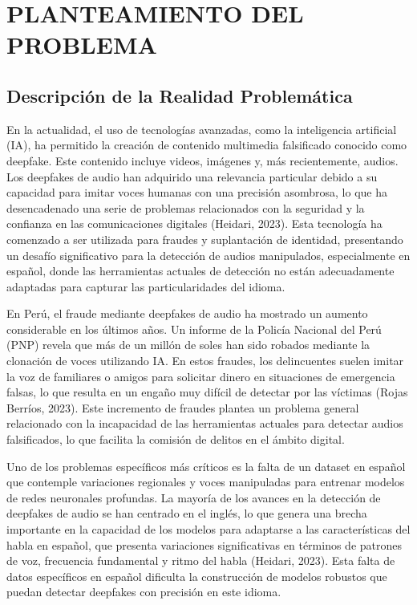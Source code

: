 \chapter{PLANTEAMIENTO DEL PROBLEMA}
\section{Descripción de la Realidad Problemática}

En la actualidad, el uso de tecnologías avanzadas, como la inteligencia artificial (IA), ha permitido la creación de contenido multimedia falsificado conocido como deepfake. Este contenido incluye videos, imágenes y, más recientemente, audios. Los deepfakes de audio han adquirido una relevancia particular debido a su capacidad para imitar voces humanas con una precisión asombrosa, lo que ha desencadenado una serie de problemas relacionados con la seguridad y la confianza en las comunicaciones digitales (Heidari, 2023). Esta tecnología ha comenzado a ser utilizada para fraudes y suplantación de identidad, presentando un desafío significativo para la detección de audios manipulados, especialmente en español, donde las herramientas actuales de detección no están adecuadamente adaptadas para capturar las particularidades del idioma.

En Perú, el fraude mediante deepfakes de audio ha mostrado un aumento considerable en los últimos años. Un informe de la Policía Nacional del Perú (PNP) revela que más de un millón de soles han sido robados mediante la clonación de voces utilizando IA. En estos fraudes, los delincuentes suelen imitar la voz de familiares o amigos para solicitar dinero en situaciones de emergencia falsas, lo que resulta en un engaño muy difícil de detectar por las víctimas (Rojas Berríos, 2023). Este incremento de fraudes plantea un problema general relacionado con la incapacidad de las herramientas actuales para detectar audios falsificados, lo que facilita la comisión de delitos en el ámbito digital.

Uno de los problemas específicos más críticos es la falta de un dataset en español que contemple variaciones regionales y voces manipuladas para entrenar modelos de redes neuronales profundas. La mayoría de los avances en la detección de deepfakes de audio se han centrado en el inglés, lo que genera una brecha importante en la capacidad de los modelos para adaptarse a las características del habla en español, que presenta variaciones significativas en términos de patrones de voz, frecuencia fundamental y ritmo del habla (Heidari, 2023). Esta falta de datos específicos en español dificulta la construcción de modelos robustos que puedan detectar deepfakes con precisión en este idioma.

